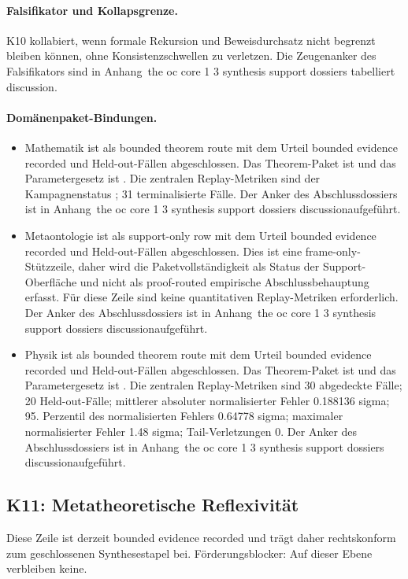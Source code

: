 \paragraph{Falsifikator und Kollapsgrenze.}
K10 kollabiert, wenn formale Rekursion und Beweisdurchsatz nicht begrenzt bleiben können, ohne Konsistenzschwellen zu verletzen.
Die Zeugenanker des Falsifikators sind in Anhang~the oc core 1 3 synthesis support dossiers tabelliert discussion.

\paragraph{Domänenpaket-Bindungen.}
\begin{itemize}[leftmargin=1.6em,nosep]
\item Mathematik ist als bounded theorem route mit dem Urteil bounded evidence recorded und  Held-out-Fällen abgeschlossen. Das Theorem-Paket ist  und das Parametergesetz ist . Die zentralen Replay-Metriken sind der Kampagnenstatus ; 31 terminalisierte Fälle. Der Anker des Abschlussdossiers ist in Anhang~the oc core 1 3 synthesis support dossiers discussionaufgeführt.
\item Metaontologie ist als support-only row mit dem Urteil bounded evidence recorded und  Held-out-Fällen abgeschlossen. Dies ist eine frame-only-Stützzeile, daher wird die Paketvollständigkeit als Status der Support-Oberfläche und nicht als proof-routed empirische Abschlussbehauptung erfasst. Für diese Zeile sind keine quantitativen Replay-Metriken erforderlich. Der Anker des Abschlussdossiers ist in Anhang~the oc core 1 3 synthesis support dossiers discussionaufgeführt.
\item Physik ist als bounded theorem route mit dem Urteil bounded evidence recorded und  Held-out-Fällen abgeschlossen. Das Theorem-Paket ist  und das Parametergesetz ist . Die zentralen Replay-Metriken sind 30 abgedeckte Fälle; 20 Held-out-Fälle; mittlerer absoluter normalisierter Fehler 0.188136 sigma; 95. Perzentil des normalisierten Fehlers 0.64778 sigma; maximaler normalisierter Fehler 1.48 sigma; Tail-Verletzungen 0. Der Anker des Abschlussdossiers ist in Anhang~the oc core 1 3 synthesis support dossiers discussionaufgeführt.
\end{itemize}

\subsection{K11: Metatheoretische Reflexivität}
\label{sec:oc-core-1-3-synthesis-k11}
Diese Zeile ist derzeit bounded evidence recorded und trägt daher rechtskonform zum geschlossenen Synthesestapel bei.
Förderungsblocker: Auf dieser Ebene verbleiben keine.

